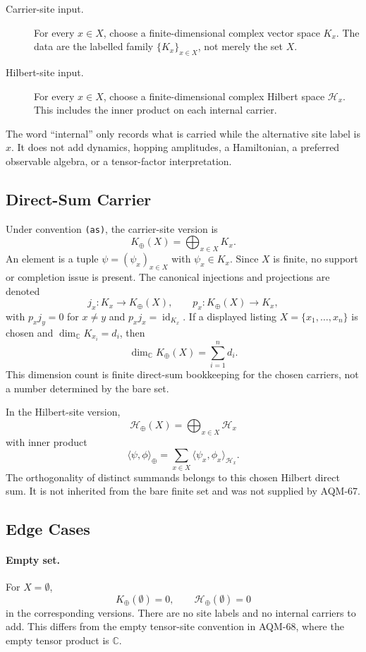 \begin{description}
\item[Carrier-site input.]
For every \(x\in X\), choose a finite-dimensional complex vector space
\(K_x\).  The data are the labelled family \(\{K_x\}_{x\in X}\), not merely
the set \(X\).

\item[Hilbert-site input.]
For every \(x\in X\), choose a finite-dimensional complex Hilbert space
\(\mathcal H_x\).  This includes the inner product on each internal carrier.
\end{description}

The word ``internal'' only records what is carried while the alternative site
label is \(x\).  It does not add dynamics, hopping amplitudes, a Hamiltonian,
a preferred observable algebra, or a tensor-factor interpretation.

\subsection{Direct-Sum Carrier}

Under convention \texttt{(as)}, the carrier-site version is
\[
  K_{\oplus}(X)=\bigoplus_{x\in X}K_x .
\]
An element is a tuple \(\psi=(\psi_x)_{x\in X}\) with
\(\psi_x\in K_x\).  Since \(X\) is finite, no support or completion issue is
present.  The canonical injections and projections are denoted
\[
  j_x:K_x\longrightarrow K_{\oplus}(X),
  \qquad
  p_x:K_{\oplus}(X)\longrightarrow K_x,
\]
with \(p_xj_y=0\) for \(x\neq y\) and \(p_xj_x=\operatorname{id}_{K_x}\).
If a displayed listing \(X=\{x_1,\ldots,x_n\}\) is chosen and
\(\dim_{\mathbb C}K_{x_i}=d_i\), then
\[
  \dim_{\mathbb C}K_{\oplus}(X)=\sum_{i=1}^n d_i .
\]
This dimension count is finite direct-sum bookkeeping for the chosen carriers,
not a number determined by the bare set.

In the Hilbert-site version,
\[
  \mathcal H_{\oplus}(X)=\bigoplus_{x\in X}\mathcal H_x
\]
with inner product
\[
  \langle \psi,\phi\rangle_{\oplus}
  =
  \sum_{x\in X}\langle \psi_x,\phi_x\rangle_{\mathcal H_x}.
\]
The orthogonality of distinct summands belongs to this chosen Hilbert direct
sum.  It is not inherited from the bare finite set and was not supplied by
AQM-67.

\subsection{Edge Cases}

\paragraph{Empty set.}
For \(X=\emptyset\),
\[
  K_{\oplus}(\emptyset)=0,
  \qquad
  \mathcal H_{\oplus}(\emptyset)=0
\]
in the corresponding versions.  There are no site labels and no internal
carriers to add.  This differs from the empty tensor-site convention in
AQM-68, where the empty tensor product is \(\mathbb C\).


